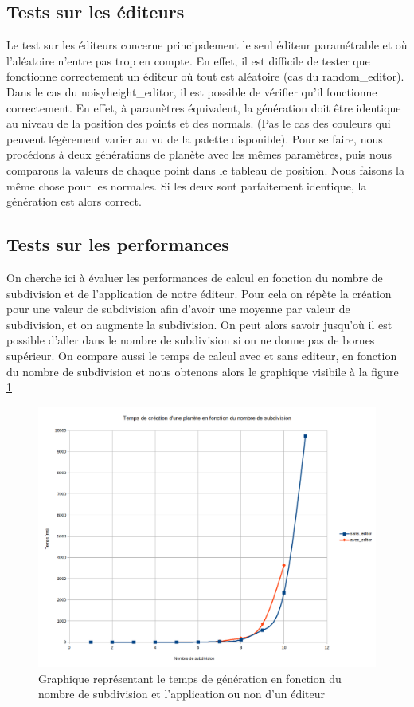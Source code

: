 \documentclass[a4paper]{article}
\begin{document}
\subsection{Tests sur les éditeurs}
Le test sur les éditeurs concerne principalement le seul éditeur paramétrable et où l'aléatoire n'entre pas trop en compte. En effet, il est difficile de tester que fonctionne correctement un éditeur où tout est aléatoire (cas du random\_editor). Dans le cas du noisyheight\_editor, il est possible de vérifier qu'il fonctionne correctement. En effet, à paramètres équivalent, la génération doit être identique au niveau de la position des points et des normals. (Pas le cas des couleurs qui peuvent légèrement varier au vu de la palette disponible). Pour se faire, nous procédons à deux générations de planète avec les mêmes paramètres, puis nous comparons la valeurs de chaque point dans le tableau de position. Nous faisons la même chose pour les normales. Si les deux sont parfaitement identique, la génération est alors correct.

\subsection{Tests sur les performances}
On cherche ici à évaluer les performances de calcul en fonction du nombre de subdivision et de l'application de notre éditeur. Pour cela on répète la création pour une valeur de subdivision afin d'avoir une moyenne par valeur de subdivision, et on augmente la subdivision. On peut alors savoir jusqu'où il est possible d'aller dans le nombre de subdivision si on ne donne pas de bornes supérieur. On compare aussi le temps de calcul avec et sans editeur, en fonction du nombre de subdivision et nous obtenons alors le graphique visibile à la figure \ref{graphperf}

\begin{figure}[!h]
    \begin{center}
        \includegraphics[scale=0.4]{img/perf.png}
        \caption{Graphique représentant le temps de génération en fonction du nombre de subdivision et l'application ou non d'un éditeur\protect\footnotemark}
        \label{graphperf}
    \end{center}
\end{figure}
\end{document}
